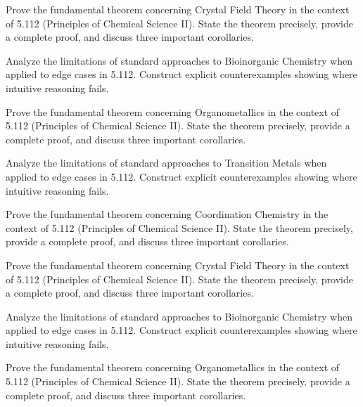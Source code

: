 \documentclass[12pt,a4paper]{exam}
\begin{document}
\begin{questions}
\question[4]
Prove the fundamental theorem concerning Crystal Field Theory in the context of 5.112 (Principles of Chemical Science II). State the theorem precisely, provide a complete proof, and discuss three important corollaries.

\vspace{0.3cm}

\question[5]
Analyze the limitations of standard approaches to Bioinorganic Chemistry when applied to edge cases in 5.112. Construct explicit counterexamples showing where intuitive reasoning fails.

\vspace{0.3cm}

\question[6]
Prove the fundamental theorem concerning Organometallics in the context of 5.112 (Principles of Chemical Science II). State the theorem precisely, provide a complete proof, and discuss three important corollaries.

\vspace{0.3cm}

\question[4]
Analyze the limitations of standard approaches to Transition Metals when applied to edge cases in 5.112. Construct explicit counterexamples showing where intuitive reasoning fails.

\vspace{0.3cm}

\question[5]
Prove the fundamental theorem concerning Coordination Chemistry in the context of 5.112 (Principles of Chemical Science II). State the theorem precisely, provide a complete proof, and discuss three important corollaries.

\vspace{0.3cm}

\question[5]
Prove the fundamental theorem concerning Crystal Field Theory in the context of 5.112 (Principles of Chemical Science II). State the theorem precisely, provide a complete proof, and discuss three important corollaries.

\vspace{0.3cm}

\question[2]
Analyze the limitations of standard approaches to Bioinorganic Chemistry when applied to edge cases in 5.112. Construct explicit counterexamples showing where intuitive reasoning fails.

\vspace{0.3cm}

\question[4]
Prove the fundamental theorem concerning Organometallics in the context of 5.112 (Principles of Chemical Science II). State the theorem precisely, provide a complete proof, and discuss three important corollaries.


\end{questions}
\end{document}
